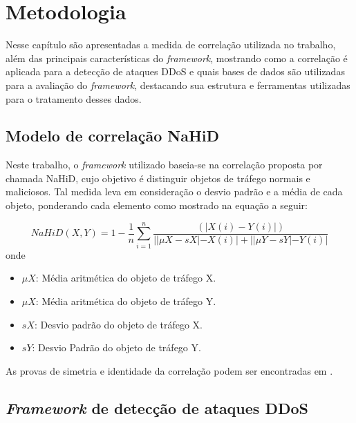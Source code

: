 \chapter[Metodologia]{Metodologia}
\label{metodologia}
Nesse capítulo são apresentadas a medida de correlação utilizada no trabalho, além das principais características do \textit{framework}, mostrando como a correlação é aplicada
para a detecção de ataques DDoS e quais bases de dados são utilizadas para a avaliação do \textit{framework}, destacando sua estrutura e ferramentas utilizadas para o tratamento desses dados.

\section{Modelo de correlação NaHiD}

Neste trabalho, o \textit{framework} utilizado baseia-se na correlação proposta por \cite{HOQUE201748} chamada NaHiD, cujo objetivo é distinguir objetos de tráfego normais e maliciosos. Tal medida leva em consideração o desvio padrão e a média de cada objeto, ponderando cada elemento como mostrado na equação a seguir:  

\begin{equation}
	NaHiD(X,Y) = 1 - \frac{1}{n} \sum_{i=1}^{n} \frac{\left(|X(i) -	 Y(i)|\right)}{||\mu{X} - sX| - X(i)| + ||\mu{Y} - sY| - Y(i)|}
\end{equation}
onde
\begin{itemize}
	\item $\mu{X}$: Média aritmética do objeto de tráfego X.
 	\item $\mu{X}$: Média aritmética do objeto de tráfego Y.
	\item $sX$: Desvio padrão do objeto de tráfego X.
	\item $sY$: Desvio Padrão do objeto de tráfego Y.
\end{itemize}
As provas de simetria e identidade da correlação podem ser encontradas em \cite{HOQUE201748}.

\section{\textit{Framework} de detecção de ataques DDoS}
 
